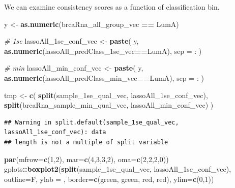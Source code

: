 \documentclass[
]{book}
\newenvironment{Shaded}{\begin{snugshade}}{\end{snugshade}}
\newcommand{\CommentTok}[1]{\textcolor[rgb]{0.56,0.35,0.01}{\textit{#1}}}
\newcommand{\DataTypeTok}[1]{\textcolor[rgb]{0.13,0.29,0.53}{#1}}
\newcommand{\DecValTok}[1]{\textcolor[rgb]{0.00,0.00,0.81}{#1}}
\newcommand{\KeywordTok}[1]{\textcolor[rgb]{0.13,0.29,0.53}{\textbf{#1}}}
\newcommand{\NormalTok}[1]{#1}
\newcommand{\OperatorTok}[1]{\textcolor[rgb]{0.81,0.36,0.00}{\textbf{#1}}}
\newcommand{\StringTok}[1]{\textcolor[rgb]{0.31,0.60,0.02}{#1}}
\begin{document}
We can examine consistency scores as a function of classification bin.

\begin{Shaded}
\begin{Highlighting}[]
\NormalTok{y <{-}}\StringTok{ }\KeywordTok{as.numeric}\NormalTok{(brcaRna\_all\_group\_vec }\OperatorTok{==}\StringTok{ \textquotesingle{}LumA\textquotesingle{}}\NormalTok{)}

\CommentTok{\# 1se}
\NormalTok{lassoAll\_1se\_conf\_vec <{-}}\StringTok{ }\KeywordTok{paste}\NormalTok{(}
\NormalTok{ y, }
 \KeywordTok{as.numeric}\NormalTok{(lassoAll\_predClass\_1se\_vec}\OperatorTok{==}\StringTok{\textquotesingle{}LumA\textquotesingle{}}\NormalTok{),}
 \DataTypeTok{sep =} \StringTok{\textquotesingle{}:\textquotesingle{}}
\NormalTok{)}

\CommentTok{\# min}
\NormalTok{lassoAll\_min\_conf\_vec <{-}}\StringTok{ }\KeywordTok{paste}\NormalTok{(}
\NormalTok{ y, }
 \KeywordTok{as.numeric}\NormalTok{(lassoAll\_predClass\_min\_vec}\OperatorTok{==}\StringTok{\textquotesingle{}LumA\textquotesingle{}}\NormalTok{),}
 \DataTypeTok{sep =} \StringTok{\textquotesingle{}:\textquotesingle{}}
\NormalTok{)}


\NormalTok{tmp <{-}}\StringTok{ }\KeywordTok{c}\NormalTok{(}
 \KeywordTok{split}\NormalTok{(sample\_1se\_qual\_vec, lassoAll\_1se\_conf\_vec), }
 \KeywordTok{split}\NormalTok{(brcaRna\_sample\_min\_qual\_vec, lassoAll\_min\_conf\_vec)}
\NormalTok{)}
\end{Highlighting}
\end{Shaded}

\begin{verbatim}
## Warning in split.default(sample_1se_qual_vec, lassoAll_1se_conf_vec): data
## length is not a multiple of split variable
\end{verbatim}

\begin{Shaded}
\begin{Highlighting}[]
\KeywordTok{par}\NormalTok{(}\DataTypeTok{mfrow=}\KeywordTok{c}\NormalTok{(}\DecValTok{1}\NormalTok{,}\DecValTok{2}\NormalTok{), }\DataTypeTok{mar=}\KeywordTok{c}\NormalTok{(}\DecValTok{4}\NormalTok{,}\DecValTok{3}\NormalTok{,}\DecValTok{3}\NormalTok{,}\DecValTok{2}\NormalTok{), }\DataTypeTok{oma=}\KeywordTok{c}\NormalTok{(}\DecValTok{2}\NormalTok{,}\DecValTok{2}\NormalTok{,}\DecValTok{2}\NormalTok{,}\DecValTok{0}\NormalTok{))}
\NormalTok{gplots}\OperatorTok{::}\KeywordTok{boxplot2}\NormalTok{(}\KeywordTok{split}\NormalTok{(sample\_1se\_qual\_vec, lassoAll\_1se\_conf\_vec), }
  \DataTypeTok{outline=}\NormalTok{F, }\DataTypeTok{ylab =} \StringTok{\textquotesingle{}\textquotesingle{}}\NormalTok{, }
  \DataTypeTok{border=}\KeywordTok{c}\NormalTok{(}\StringTok{\textquotesingle{}green\textquotesingle{}}\NormalTok{, }\StringTok{\textquotesingle{}green\textquotesingle{}}\NormalTok{, }\StringTok{\textquotesingle{}red\textquotesingle{}}\NormalTok{, }\StringTok{\textquotesingle{}red\textquotesingle{}}\NormalTok{),}
  \DataTypeTok{ylim=}\KeywordTok{c}\NormalTok{(}\DecValTok{0}\NormalTok{,}\DecValTok{1}\NormalTok{))}
\end{Highlighting}
\end{Shaded}
\end{document}
